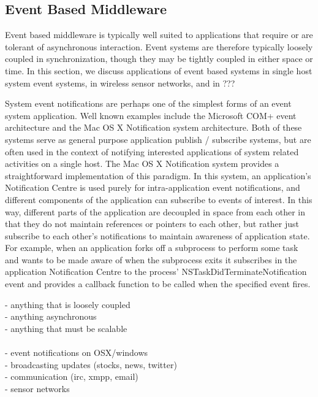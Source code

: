 \documentclass{acm_proc_article-sp}
\begin{document}
\subsection{Event Based Middleware}

Event based middleware is typically well suited to applications that require or are tolerant of asynchronous interaction. Event systems are therefore typically loosely coupled in synchronization, though they may be tightly coupled in either space or time. In this section, we discuss applications of event based systems in single host system event systems, in wireless sensor networks, and in ???

System event notifications are perhaps one of the simplest forms of an event system application. Well known examples include the Microsoft COM+ event architecture and the Mac OS X Notification system architecture. Both of these systems serve as general purpose application publish / subscribe systems, but are often used in the context of notifying interested applications of system related activities on a single host. The Mac OS X Notification system \cite{nsnotification} provides a straightforward implementation of this paradigm. In this system, an application's Notification Centre is used purely for intra-application event notifications, and different components of the application can subscribe to events of interest. In this way, different parts of the application are decoupled in space from each other in that they do not maintain references or pointers to each other, but rather just subscribe to each other's notifications to maintain awareness of application state. For example, when an application forks off a subprocess to perform some task and wants to be made aware of when the subprocess exits it subscribes in the application Notification Centre to the process' NSTaskDidTerminateNotification event and provides a callback function to be called when the specified event fires. 


- anything that is loosely coupled\\
- anything asynchronous\\
- anything that must be scalable\\
\\
- event notifications on OSX/windows\\
- broadcasting updates (stocks, news, twitter)\\
- communication (irc, xmpp, email)\\
- sensor networks\\
\end{document}
